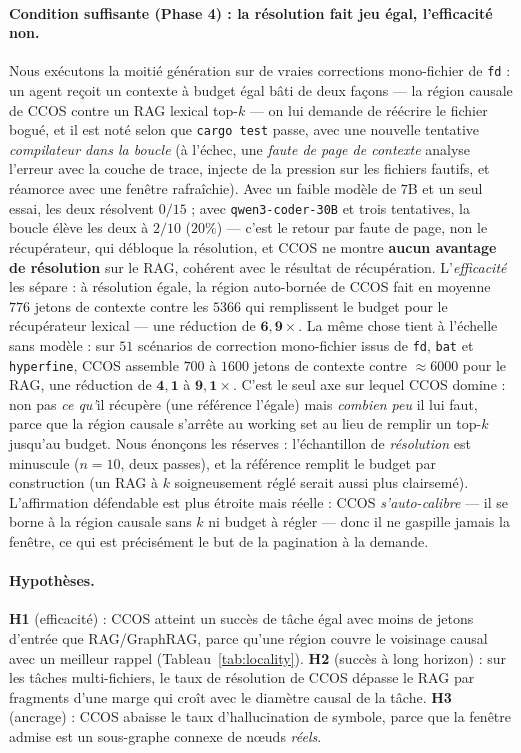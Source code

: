 \documentclass[11pt]{article}
\newcommand{\code}[1]{\texttt{#1}}
\begin{document}
\paragraph{Condition suffisante (Phase 4) : la résolution fait jeu égal, l'efficacité
non.} Nous exécutons la moitié génération sur de vraies corrections mono-fichier de
\code{fd} : un agent reçoit un contexte à budget égal bâti de deux façons --- la région
causale de CCOS contre un RAG lexical top-$k$ --- on lui demande de réécrire le fichier
bogué, et il est noté selon que \code{cargo test} passe, avec une nouvelle tentative
\emph{compilateur dans la boucle} (à l'échec, une \emph{faute de page de contexte} analyse
l'erreur avec la couche de trace, injecte de la pression sur les fichiers fautifs, et
réamorce avec une fenêtre rafraîchie). Avec un faible modèle de $7$B et un seul essai, les
deux résolvent $0/15$ ; avec \code{qwen3-coder-30B} et trois tentatives, la boucle élève
les deux à $2/10$ ($20\%$) --- c'est le retour par faute de page, non le récupérateur, qui
débloque la résolution, et CCOS ne montre \textbf{aucun avantage de résolution} sur le RAG,
cohérent avec le résultat de récupération. L'\emph{efficacité} les sépare : à résolution
égale, la région auto-bornée de CCOS fait en moyenne $776$ jetons de contexte contre les
$5366$ qui remplissent le budget pour le récupérateur lexical --- une réduction de
$\mathbf{6{,}9\times}$. La même chose tient à l'échelle sans modèle : sur $51$ scénarios de
correction mono-fichier issus de \code{fd}, \code{bat} et \code{hyperfine}, CCOS assemble
$700$ à $1600$ jetons de contexte contre $\approx\!6000$ pour le RAG, une réduction de
$\mathbf{4{,}1}$ à $\mathbf{9{,}1\times}$. C'est le seul axe sur lequel CCOS domine : non
pas \emph{ce qu'}il récupère (une référence l'égale) mais \emph{combien peu} il lui faut,
parce que la région causale s'arrête au working set au lieu de remplir un top-$k$ jusqu'au
budget. Nous énonçons les réserves : l'échantillon de \emph{résolution} est minuscule
($n{=}10$, deux passes), et la référence remplit le budget par construction (un RAG à $k$
soigneusement réglé serait aussi plus clairsemé). L'affirmation défendable est plus étroite
mais réelle : CCOS \emph{s'auto-calibre} --- il se borne à la région causale sans $k$ ni
budget à régler --- donc il ne gaspille jamais la fenêtre, ce qui est précisément le but de
la pagination à la demande.

\paragraph{Hypothèses.}
\textbf{H1} (efficacité) : CCOS atteint un succès de tâche égal avec moins de jetons
d'entrée que RAG/GraphRAG, parce qu'une région couvre le voisinage causal avec un meilleur
rappel (Tableau~\ref{tab:locality}).
\textbf{H2} (succès à long horizon) : sur les tâches multi-fichiers, le taux de résolution
de CCOS dépasse le RAG par fragments d'une marge qui croît avec le diamètre causal de la
tâche.
\textbf{H3} (ancrage) : CCOS abaisse le taux d'hallucination de symbole, parce que la
fenêtre admise est un sous-graphe connexe de nœuds \emph{réels}.
\end{document}
